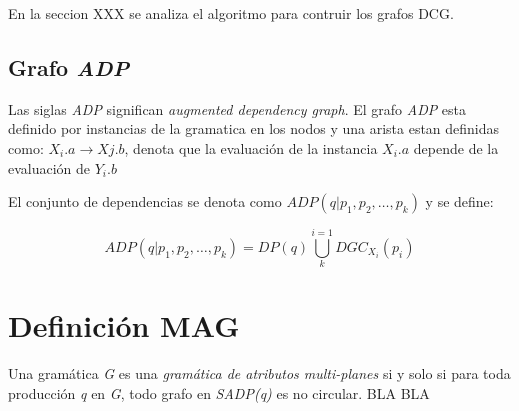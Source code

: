 En la seccion XXX se analiza el algoritmo para contruir los grafos DCG.

\subsection{Grafo \textit{ADP}}

Las siglas \textit{ADP} significan \textit{augmented dependency graph}. El grafo \textit{ADP} esta definido por instancias de la gramatica en los nodos y una arista estan definidas como: $X_{i}.a\rightarrow X{j}.b$, denota que la evaluación de la instancia \textit{$X_{i}.a$} depende de la evaluación de \textit{$Y_{i}.b$}

El conjunto de dependencias se denota como $ADP (q | p_{1}, p_{2}, \dots, p_{k})$ y se define:
\begin{definition}
\begin{equation}
 ADP (q | p_{1}, p_{2}, \dots, p_{k}) = DP(q) \bigcup\limits_{k}^{i=1}{DGC_{X_{i}}} (p_{i})
\end{equation}
\end{definition}


\section{Definición MAG}

Una gramática \textit{G} es una \textit{gramática de atributos multi-planes} si y solo si para toda producción \textit{q} en \textit{G}, todo grafo en \textit{SADP(q)} es no circular.
BLA BLA   
